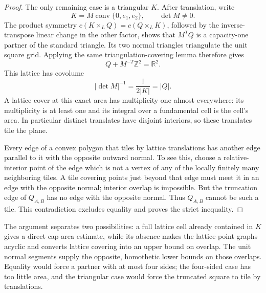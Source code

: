 \begin{proof}
The only remaining case is a triangular $K$. After translation, write
\[
 K=M\operatorname{conv}\{0,e_1,e_2\},\qquad \det M\ne0.
\]
The product symmetry $c(K\times_L Q)=c(Q\times_L K)$, followed by the
inverse-transpose linear change in the other factor, shows that $M^TQ$
is a capacity-one partner of the standard triangle. Its two normal
triangles triangulate the unit square grid. Applying the same
triangulation-covering lemma therefore gives
\[
 Q+M^{-T}\mathbb Z^2=\mathbb R^2.
\]
This lattice has covolume
\[
 |\det M|^{-1}=\frac{1}{2|K|}=|Q|.
\]
A lattice cover at this exact area has multiplicity one almost everywhere:
its multiplicity is at least one and its integral over a fundamental cell
is the cell's area. In particular distinct translates have disjoint
interiors, so these translates tile the plane.

Every edge of a convex polygon that tiles by lattice translations has
another edge parallel to it with the opposite outward normal. To see this,
choose a relative-interior point of the edge which is not a vertex of any
of the locally finitely many neighboring tiles. A tile covering points
just beyond that edge must meet it in an edge with the opposite normal;
interior overlap is impossible. But the truncation edge of $Q_{A,B}$ has
no edge with the opposite normal. Thus $Q_{A,B}$ cannot be such a tile.
This contradiction excludes equality and proves the strict inequality.
\end{proof}

The argument separates two possibilities: a full lattice cell already
contained in $K$ gives a direct cap-area estimate, while its absence makes
the lattice-point graphs acyclic and converts lattice covering into an
upper bound on overlap. The unit normal segments supply the opposite,
homothetic lower bounds on those overlaps. Equality would force a partner
with at most four sides; the four-sided case has too little area, and the
triangular case would force the truncated square to tile by translations.
